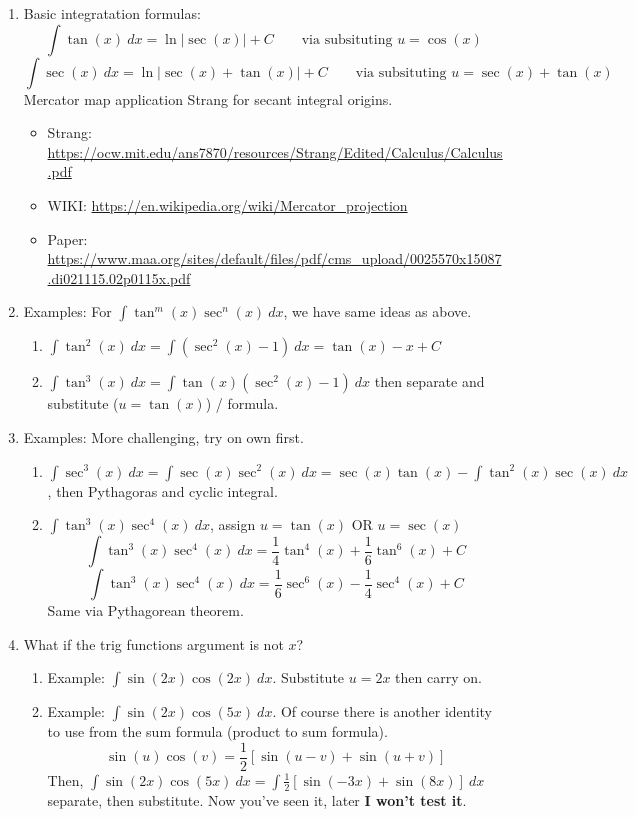 \documentclass{article}
\newcommand{\ds}{\displaystyle}
\begin{document}
\begin{enumerate}
\item Basic integratation formulas:
\[
\int \tan (x)~dx = \ln|\sec(x)|+C \quad\quad \text{via subsituting $u=\cos(x)$}
\]
\[
\int \sec(x)~dx = \ln|\sec(x) +\tan(x)|+C \quad\quad \text{via subsituting $u=\sec(x)+\tan(x)$}
\]
Mercator map application Strang for secant integral origins.
\begin{itemize}
\item Strang: \url{https://ocw.mit.edu/ans7870/resources/Strang/Edited/Calculus/Calculus.pdf}
\item WIKI:  \url{https://en.wikipedia.org/wiki/Mercator_projection}
\item Paper: \url{https://www.maa.org/sites/default/files/pdf/cms_upload/0025570x15087.di021115.02p0115x.pdf}
\end{itemize}

\item Examples: For $\ds \int \tan^m(x)\sec^n(x)~dx$, we have same ideas as above.
\begin{enumerate}
\item $\ds \int \tan^2(x)~dx = \int (\sec^2(x)-1)~dx = \tan(x)-x+C$
\item $\ds \int \tan^3(x)~dx = \int \tan(x)(\sec^2(x)-1) ~dx$ then separate and substitute ($u=\tan(x)$) / formula.
\end{enumerate}

\item Examples: More challenging, try on own first.
\begin{enumerate}
\item $\ds \int \sec^3(x)~dx = \int \sec(x)\sec^2(x)~dx= \sec(x)\tan(x)-\int \tan^2(x)\sec(x)~dx$, then Pythagoras and cyclic integral.
\item $\ds \int \tan^3(x)\sec^4(x)~dx$, assign $u=\tan(x)$ OR $u = \sec(x)$
$$
\int \tan^3(x)\sec^4(x)~dx= \frac{1}{4}\tan^4(x)+\frac{1}{6}\tan^6(x)+C
$$
$$
\int \tan ^3(x)\sec^4(x)~dx  = \frac{1}{6} \sec^6(x)-\frac{1}{4}\sec^4(x)+C
$$
Same via Pythagorean theorem.
\end{enumerate}

\item What if the trig functions argument is not $x$?
\begin{enumerate}
\item Example: $\ds \int \sin(2x)\cos(2x)~dx$. Substitute $u=2x$ then carry on.
\item Example: $\ds \int \sin(2x)\cos(5x)~dx$. Of course there is another identity to use from the sum formula (product to sum formula).
\[
\sin(u)\cos(v) = \frac{1}{2}\left[\sin(u-v)+\sin(u+v)\right]
\]
Then,  $\ds \int \sin(2x)\cos(5x)~dx = \int \frac{1}{2}\left[\sin(-3x)+\sin(8x)\right] ~dx$ separate, then substitute.
Now you've seen it, later {\bf I won't test it}.
\end{enumerate}
\end{enumerate}
\end{document}
